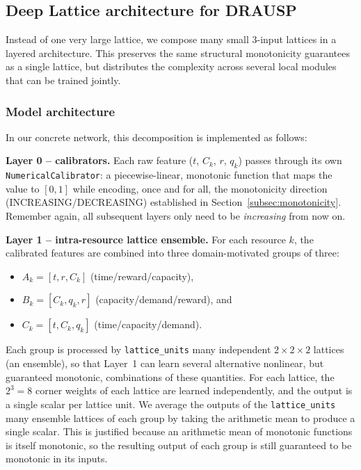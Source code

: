 \subsection{Deep Lattice architecture for DRAUSP}
Instead of one very large lattice, we compose many small 3-input lattices in a layered architecture. This preserves the same structural monotonicity guarantees as a single lattice, but distributes the complexity across several local modules that can be trained jointly. 
\subsubsection{Model architecture}
\label{subsec:lattice-architecture}

In our concrete network, this decomposition is implemented as follows:

\textbf{Layer 0 -- calibrators.} Each raw feature ($t$, $C_k$, $r$, $q_k$) passes through its own
\texttt{NumericalCalibrator}: a piecewise-linear, monotonic function that maps the value to
$[0,1]$ while encoding, once and for all, the monotonicity direction (INCREASING/DECREASING)
established in Section~\ref{subsec:monotonicity}. Remember again, all subsequent layers only
need to be \emph{increasing} from now on.

\textbf{Layer 1 -- intra-resource lattice ensemble.} For each resource $k$, the calibrated
features are combined into three domain-motivated groups of three:
\begin{itemize}
  \item $A_k = [t, r, C_k]$ (time/reward/capacity),
  \item $B_k = [C_k, q_k, r]$ (capacity/demand/reward), and
  \item $C_k = [t, C_k, q_k]$ (time/capacity/demand).
\end{itemize}
Each group is processed by \texttt{lattice\_units} many independent $2\times2\times2$ lattices
(an ensemble), so that Layer~1 can learn several alternative nonlinear, but guaranteed monotonic,
combinations of these quantities. 
For each lattice, the $2^3=8$ corner weights of each lattice are learned independently, and the output is a single scalar per lattice unit.
We average the outputs of the \texttt{lattice\_units} many ensemble lattices of each group by taking the arithmetic mean to produce a single scalar. This is justified because an arithmetic mean of monotonic functions is itself monotonic, so the resulting output of each group is still guaranteed to be monotonic in its inputs.

